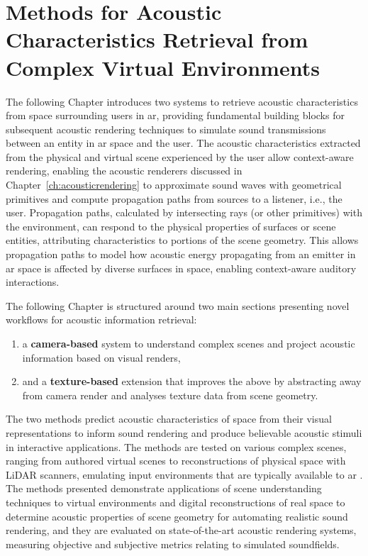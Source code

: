 \chapter{Methods for Acoustic Characteristics Retrieval from Complex Virtual Environments}\label{ch:Materials} %
The following Chapter introduces two systems to retrieve acoustic characteristics from space surrounding users in \acrshort{ar}, providing fundamental building blocks for subsequent acoustic rendering techniques to simulate sound transmissions between an entity in \acrshort{ar} space and the user. The acoustic characteristics extracted from the physical and virtual scene experienced by the user allow context-aware rendering, enabling the acoustic renderers discussed in Chapter~\ref{ch:acousticrendering} to approximate sound waves with geometrical primitives and compute propagation paths from sources to a listener, i.e., the user. Propagation paths, calculated by intersecting rays (or other primitives) with the environment, can respond to the physical properties of surfaces or scene entities, attributing characteristics to portions of the scene geometry. This allows propagation paths to model how acoustic energy propagating from an emitter in \acrshort{ar} space is affected by diverse surfaces in space, enabling context-aware auditory interactions.\par
The following Chapter is structured around two main sections presenting novel workflows for acoustic information retrieval:
\begin{enumerate}
    \item a \textbf{camera-based} system to understand complex scenes and project acoustic information based on visual renders,
    \item and a \textbf{texture-based} extension that improves the above by abstracting away from camera render and analyses texture data from scene geometry.
\end{enumerate}
The two methods predict acoustic characteristics of space from their visual representations to inform sound rendering and produce believable acoustic stimuli in interactive applications. The methods are tested on various complex scenes, ranging from authored virtual scenes to reconstructions of physical space with LiDAR scanners, emulating input environments that are typically available to \acrshort{ar} . The methods presented demonstrate applications of scene understanding techniques to virtual environments and digital reconstructions of real space to determine acoustic properties of scene geometry for automating realistic sound rendering, and they are evaluated on state-of-the-art acoustic rendering systems, measuring objective and subjective metrics relating to simulated soundfields.\par

